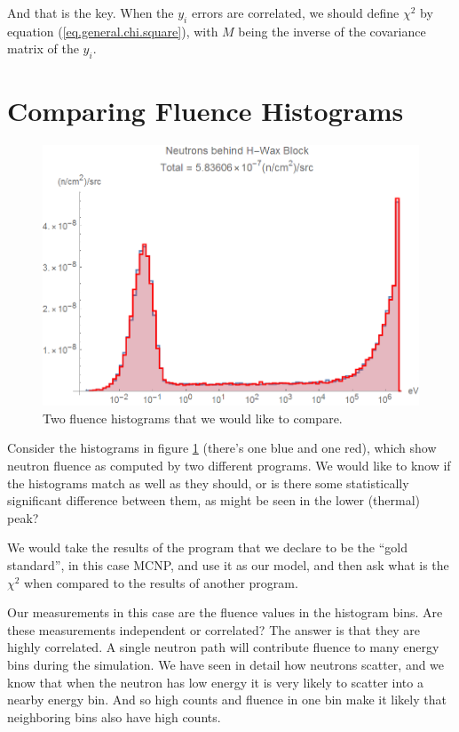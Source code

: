 \documentclass[letterpaper,12pt]{article}
\newcommand{\myMatrix}[1]{\bm{\mathit{#1}}}
\begin{document}
And that is the key. When the $y_i$ errors are correlated, we should define $\chi^2$ by equation (\ref{eq.general.chi.square}), with $\myMatrix{M}$ being the inverse of the covariance matrix of the $y_i$.

\section{Comparing Fluence Histograms}

\begin{figure}[ht] 
\centering	\includegraphics[width=0.7\columnwidth]{sn2304}
	\caption{
		\label{fig.fluence}
		Two fluence histograms that we would like to compare.
	}
\end{figure}

Consider the histograms in figure \ref{fig.fluence} (there's one blue and one red), which show neutron fluence as computed by two different programs. We would like to know if the histograms match as well as they should, or is there some statistically significant difference between them, as might be seen in the lower (thermal) peak? 

We would take the results of the program that we declare to be the ``gold standard'', in this case MCNP, and use it as our model, and then ask what is the $\chi^2$ when compared to the results of another program.

Our measurements in this case are the fluence values in the histogram bins. Are these measurements independent or correlated? The answer is that they are highly correlated. A single neutron path will contribute fluence to many energy bins during the simulation. We have seen in detail how neutrons scatter, and we know that when the neutron has low energy it is very likely to scatter into a nearby energy bin. And so high counts and fluence in one bin make it likely that neighboring bins also have high counts.
\end{document}
